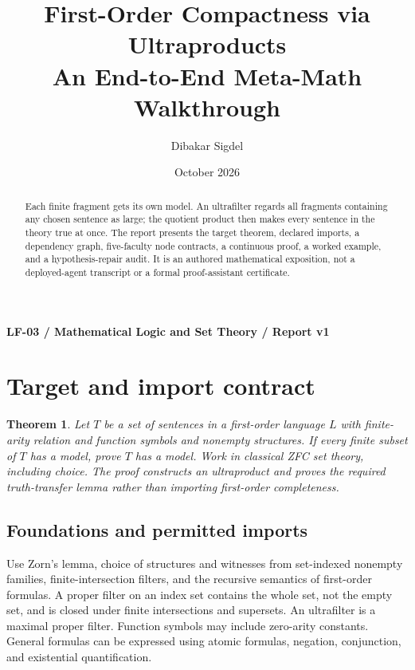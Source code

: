 \documentclass[preprint,12pt,aps,pra,showkeys,amsmath,amssymb,superscriptaddress,floatfix]{revtex4-2}
\newtheorem{theorem}{Theorem}[section]
\theoremstyle{definition}
\theoremstyle{remark}
\begin{document}
\title{First-Order Compactness via Ultraproducts\\[4pt]\large An End-to-End Meta-Math Walkthrough}

\author{Dibakar Sigdel}


\date{October 2026}

\begin{abstract}

Each finite fragment gets its own model. An ultrafilter regards all
fragments containing any chosen sentence as large; the quotient product
then makes every sentence in the theory true at once. The report
presents the target theorem, declared imports, a dependency graph,
five-faculty node contracts, a continuous proof, a worked example, and a
hypothesis-repair audit. It is an authored mathematical exposition, not
a deployed-agent transcript or a formal proof-assistant certificate.

\end{abstract}\maketitle\linespread{1.12}\selectfont

\noindent\textbf{LF-03 / Mathematical Logic and Set Theory / Report v1}

\section{Target and import contract}

\begin{theorem}

Let \(T\) be a set of sentences in a first-order language \(L\) with
finite-arity relation and function symbols and nonempty structures. If
every finite subset of \(T\) has a model, prove \(T\) has a model. Work
in classical ZFC set theory, including choice. The proof constructs an
ultraproduct and proves the required truth-transfer lemma rather than
importing first-order completeness.

\end{theorem}

\subsection{Foundations and permitted imports}

Use Zorn's lemma, choice of structures and witnesses from set-indexed
nonempty families, finite-intersection filters, and the recursive
semantics of first-order formulas. A proper filter on an index set
contains the whole set, not the empty set, and is closed under finite
intersections and supersets. An ultrafilter is a maximal proper filter.
Function symbols may include zero-arity constants. General formulas can
be expressed using atomic formulas, negation, conjunction, and
existential quantification.
\end{document}
